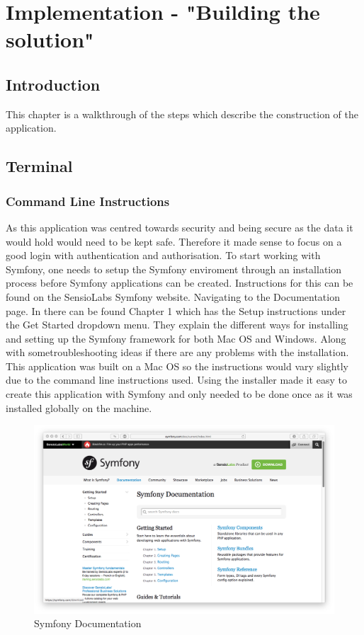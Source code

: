 \chapter{Implementation - "Building the solution"}


\section{Introduction}

This chapter is a walkthrough of the steps which describe the construction of the application.

\section{Terminal}

\subsection{Command Line Instructions}

As this application was centred towards security and being secure as the data it would hold would need to be kept safe. Therefore it made sense to focus on a good login with authentication and authorisation. To start working with Symfony, one needs to setup the Symfony enviroment through an installation process before Symfony applications can be created. Instructions for this can be found on the SensioLabs Symfony website. Navigating to the Documentation page. In there can be found Chapter 1 which has the Setup instructions under the Get Started dropdown menu. They explain the different ways for installing and setting up the Symfony framework for both Mac OS and Windows. Along with some\newline troubleshooting ideas if there are any problems with the installation. This application was built on a Mac OS so the instructions would vary slightly due to the command line instructions used. Using the installer made it easy to create this application with Symfony and only needed to be done once as it was installed globally on the machine.

\begin{figure}[htbp]
   \centering
   \includegraphics[width=400pt]{figures/symfony_documentation.png} %
   \caption{Symfony Documentation}
   \label{fig:Symfony Documentation}
\end{figure}

